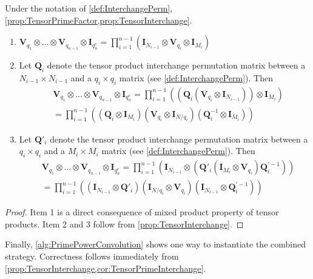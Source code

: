 \begin{corollary} \label{cor:TensorPrimeInterchange}
    Under the notation of \cref{def:InterchangePerm}, \cref{prop:TensorPrimeFactor,prop:TensorInterchange}.
    \begin{enumerate}
        \item \(\bm{V}_{q_1} \otimes \ldots \otimes \bm{V}_{q_{n-1}} \otimes \bm{I}_{q_n^e} = \prod_{i=1}^{n-1} \left(\bm{I}_{N_{i-1}} \otimes \bm{V}_{q_i} \otimes \bm{I}_{M_i}\right)\)
        \item Let \(\bm{Q}_i\) denote the tensor product interchange permutation matrix between a \(N_{i-1} \times N_{i-1}\) and a \(q_i \times q_i\) matrix (see \cref{def:InterchangePerm}). Then
            \begin{align*}
                & \bm{V}_{q_1} \otimes \ldots \otimes \bm{V}_{q_{n-1}} \otimes \bm{I}_{q_n^e}
                = \prod_{i=1}^{n-1} \left(\left(\bm{Q}_i \left(\bm{V}_{q_i} \otimes \bm{I}_{N_{i-1}}\right)\right) \otimes \bm{I}_{M_i}\right) \\
                &= \prod_{i=1}^{n-1} \left( \left(\bm{Q}_i \otimes \bm{I}_{M_i}\right) \left(\bm{V}_{q_i} \otimes \bm{I}_{N/q_i}\right) \left(\bm{Q}_i^{-1} \otimes \bm{I}_{M_i}\right)\right)
            \end{align*}
        \item Let \(\bm{Q}'_i\) denote the tensor product interchange permutation matrix between a \(q_i \times q_i\) and a \(M_i \times M_i\) matrix (see \cref{def:InterchangePerm}). Then
            \begin{align*}
                & \bm{V}_{q_1} \otimes \ldots \otimes \bm{V}_{q_{n-1}} \otimes \bm{I}_{q_n^e}
                = \prod_{i=1}^{n-1} \left( \bm{I}_{N_{i-1}} \otimes \left(\bm{Q}'_i \left(\bm{I}_{M_i} \otimes \bm{V}_{q_i}\right) \bm{Q}_i^{'-1}\right)\right) \\
                &= \prod_{i=1}^{n-1} \left(\left(\bm{I}_{N_{i-1}} \otimes \bm{Q}'_i\right) \left(\bm{I}_{N/q_i} \otimes \bm{V}_{q_i}\right) \left(\bm{I}_{N_{i-1}} \otimes \bm{Q}_i^{'-1}\right)\right)
            \end{align*}
    \end{enumerate}
\end{corollary}
\begin{proof}
    Item 1 is a direct consequence of mixed product property of tensor products. Item 2 and 3 follow from \cref{prop:TensorInterchange}.
\end{proof}

Finally, \cref{alg:PrimePowerConvolution} shows one way to instantiate the combined strategy. Correctness follows immediately from \cref{prop:TensorInterchange,cor:TensorPrimeInterchange}.

